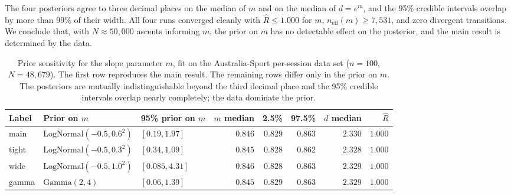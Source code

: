 \documentclass[11pt]{article}
\begin{document}
The four posteriors agree to three decimal places on the median of $m$ and on the median of $d = e^m$, and the 95\% credible intervals overlap by more than $99\%$ of their width. All four runs converged cleanly with $\hat{R} \leq 1.000$ for $m$, $n_{\mathrm{eff}}(m) \geq 7{,}531$, and zero divergent transitions. We conclude that, with $N \approx 50{,}000$ ascents informing $m$, the prior on $m$ has no detectable effect on the posterior, and the main result is determined by the data.

\begin{table}[ht]
\centering
\begin{tabular}{lllrrrrr}
\toprule
{\bf Label} & {\bf Prior on $m$} & {\bf 95\% prior on $m$} & {$m$ median} & {2.5\%} & {97.5\%} & {$d$ median} & {$\hat{R}$} \\
\midrule
main & $\mathrm{LogNormal}(-0.5, 0.6^2)$ & $[0.19, 1.97]$ & $0.846$ & $0.829$ & $0.863$ & $2.330$ & $1.000$ \\
tight    & $\mathrm{LogNormal}(-0.5, 0.3^2)$ & $[0.34, 1.09]$ & $0.845$ & $0.828$ & $0.862$ & $2.328$ & $1.000$ \\
wide     & $\mathrm{LogNormal}(-0.5, 1.0^2)$ & $[0.085, 4.31]$& $0.846$ & $0.828$ & $0.863$ & $2.329$ & $1.000$ \\
gamma    & $\mathrm{Gamma}(2, 4)$            & $[0.06, 1.39]$ & $0.845$ & $0.829$ & $0.863$ & $2.329$ & $1.000$ \\
\bottomrule
\end{tabular}
\caption{Prior sensitivity for the slope parameter $m$, fit on the Australia-Sport per-session data set ($n = 100$, $N = 48{,}679$). The first row reproduces the main result. The remaining rows differ only in the prior on $m$. The posteriors are mutually indistinguishable beyond the third decimal place and the 95\% credible intervals overlap nearly completely; the data dominate the prior.}
\label{si:prior-sensitivity-summary}
\end{table}




\end{document}
